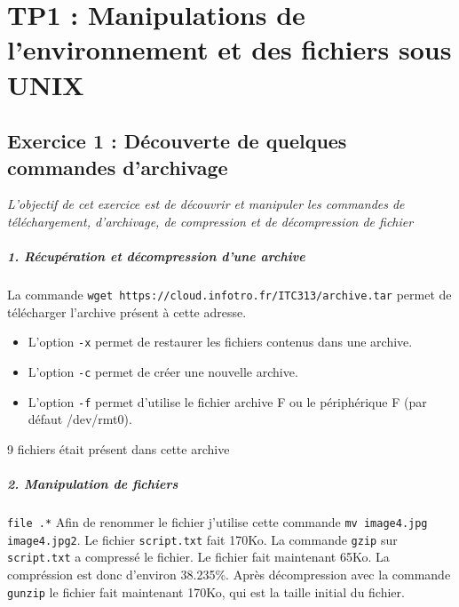 \chapter{TP1 : Manipulations de l’environnement et des fichiers sous UNIX}
    \section{Exercice 1 : Découverte de quelques commandes d'archivage}
    \textit{L'objectif de cet exercice est de découvrir et manipuler les commandes de téléchargement, d'archivage, de compression et de décompression de fichier}
        \paragraph{1. Récupération et décompression d'une archive}
            La commande \texttt{wget https://cloud.infotro.fr/ITC313/archive.tar} permet de télécharger l'archive présent à cette adresse.
            \begin{itemize}
                \item L'option \texttt{-x} permet de restaurer les fichiers contenus dans une archive.
                \item L'option \texttt{-c} permet de créer une nouvelle archive.
                \item L'option \texttt{-f} permet d'utilise le fichier archive F ou le périphérique F (par défaut /dev/rmt0).
            \end{itemize}
            9 fichiers était présent dans cette archive
        \paragraph{2. Manipulation de fichiers}
            \texttt{file .\/*}
            Afin de renommer le fichier j'utilise cette commande \texttt{mv image4.jpg image4.jpg2}.
            Le fichier \texttt{script.txt} fait 170Ko.
            La commande \texttt{gzip} sur \texttt{script.txt} a compressé le fichier.
            Le fichier fait maintenant  65Ko.
            La compréssion est donc d'environ 38.235\%.
            Après décompression avec la commande \texttt{gunzip} le fichier fait maintenant 170Ko, qui est la taille initial du fichier.
